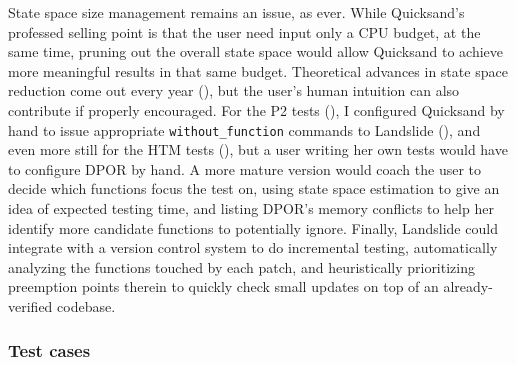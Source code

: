 State space size management remains an issue, as ever.
While Quicksand's professed selling point is that the user need input only a CPU budget,
at the same time,
pruning out the overall state space would allow Quicksand to achieve more meaningful results in that same budget.
Theoretical advances in state space reduction come out every year (\sect{\ref{sec:related-algs}}),
but the user's human intuition can also contribute if properly encouraged.
For the P2 tests (\sect{\ref{sec:education-pebbles-tests}}),
I configured Quicksand by hand to issue appropriate {\tt without\_function} commands to Landslide
(\sect{\ref{sec:landslide-pps}}),
and even more still for the HTM tests (\sect{\ref{sec:tm-eval-exp-setup}}),
but a user writing her own tests would have to configure DPOR by hand.
A more mature version would coach the user to decide which functions focus the test on,
using state space estimation to give an idea of expected testing time,
and listing DPOR's memory conflicts to help her identify more candidate functions to potentially ignore.
Finally, Landslide could integrate with a version control system to do incremental testing,
automatically analyzing the functions touched by each patch,
and heuristically prioritizing preemption points therein
to quickly check small updates on top of an already-verified codebase.

\subsubsection{Test cases}



